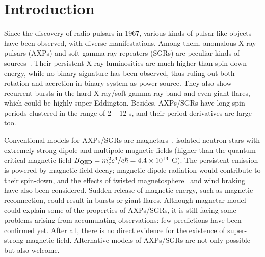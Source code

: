 \documentclass[]{raa}
\begin{document}
   \maketitle


%
\section{Introduction}           %

Since the discovery of radio pulsars in 1967, various kinds of pulsar-like objects have been observed, with diverse manifestations. 
%
Among them, anomalous X-ray pulsars (AXPs) and soft gamma-ray repeaters (SGRs) are peculiar kinds of sources~\citep{Mereghetti08}.
%
Their persistent X-ray luminosities are much higher than spin down energy, while no binary signature has been observed, thus ruling out both rotation and accretion in binary system as power source.
%
They also show recurrent bursts in the hard X-ray/soft gamma-ray band and even giant flares, which could be highly super-Eddington. 
%
Besides, AXPs/SGRs have long spin periods clustered in the range of 2 -- 12 s, and their period derivatives are large too.
%

Conventional models for AXPs/SGRs are magnetars~\citep{Duncan92}, isolated neutron stars with extremely strong dipole and multipole magnetic fields (higher than the quantum critical magnetic field $B_{\rm QED} = m^2_ec^3/e\hbar = 4.4 \times 10^{13}$ G). 
%
The persistent emission is powered by magnetic field decay; magnetic dipole radiation would contribute to their spin-down, and the effects of twisted magnetosphere~\citep{Thompson02} and wind braking~\citep{Tong13} have also been considered.
%
Sudden release of magnetic energy, such as magnetic reconnection, could result in bursts or giant flares.
%
Although magnetar model could explain some of the properties of AXPs/SGRs, it is still facing some problems arising from accumulating observations: few predictions have been confirmed yet.
%
%
%
%
%
%
After all, there is no direct evidence for the existence of super-strong magnetic field.
%
Alternative models of AXPs/SGRs are not only possible but also welcome.
%
 
\end{document}
